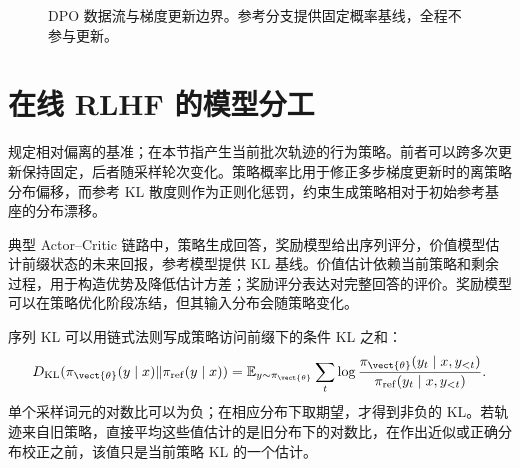 \documentclass[../textbook.tex]{subfiles}
\begin{document}
\begin{figure}[htbp]
\centering
{}
\caption[DPO 数据流与梯度更新边界]{DPO 数据流与梯度更新边界。参考分支提供固定概率基线，全程不参与更新。}\label{fig:pref-dpo}
\end{figure}

\section{在线 RLHF 的模型分工}

规定相对偏离的基准；在本节指产生当前批次轨迹的行为策略。前者可以跨多次更新保持固定，后者随采样轮次变化。策略概率比用于修正多步梯度更新时的离策略分布偏移，而参考 KL 散度则作为正则化惩罚，约束生成策略相对于初始参考基座的分布漂移。

典型 Actor--Critic 链路中，策略生成回答，奖励模型给出序列评分，价值模型估计前缀状态的未来回报，参考模型提供 KL 基线。价值估计依赖当前策略和剩余过程，用于构造优势及降低估计方差；奖励评分表达对完整回答的评价。奖励模型可以在策略优化阶段冻结，但其输入分布会随策略变化。

序列 KL 可以用链式法则写成策略访问前缀下的条件 KL 之和：
\begin{equation}
 D_{\mathrm{KL}}(\pi_{\vect{\theta}}(y\mid x)\|\pi_{\mathrm{ref}}(y\mid x))
 =\mathbb E_{y\sim\pi_{\vect{\theta}}}\sum_t
 \log\frac{\pi_{\vect{\theta}}(y_t\mid x,y_{<t})}{\pi_{\mathrm{ref}}(y_t\mid x,y_{<t})}.
 \label{eq:pref-kl-chain}
\end{equation}
单个采样词元的对数比可以为负；在相应分布下取期望，才得到非负的 KL。若轨迹来自旧策略，直接平均这些值估计的是旧分布下的对数比，在作出近似或正确分布校正之前，该值只是当前策略 KL 的一个估计。
\end{document}
